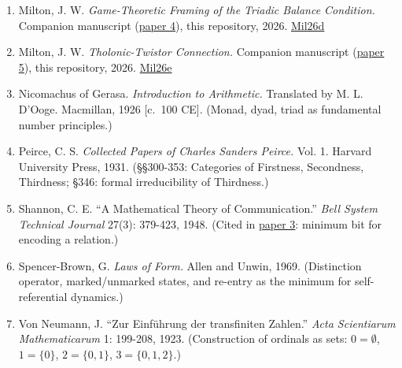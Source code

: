 \documentclass[12pt]{article}
\begin{document}
\begin{enumerate}
{  3}), this repository, 2026.
  \href{https://github.com/baardev/truevalue/blob/main/docnav/Research/papers/3_minimal-recursive-triadic-framework/3_minimal-recursive-triadic-framework.pdf}{Mil26b}
\item
  Milton, J. W. \emph{Game-Theoretic Framing of the Triadic Balance
  Condition.} Companion manuscript
  (\href{https://github.com/baardev/truevalue/blob/main/docnav/Research/papers/4_game-theoretic-triadic-balance/4_game-theoretic-triadic-balance.pdf}{paper
  4}), this repository, 2026.
  \href{https://github.com/baardev/truevalue/blob/main/docnav/Research/papers/4_game-theoretic-triadic-balance/4_game-theoretic-triadic-balance.pdf}{Mil26d}
\item
  Milton, J. W. \emph{Tholonic-Twistor Connection.} Companion manuscript
  (\href{https://github.com/baardev/truevalue/blob/main/docnav/Research/papers/5_tholonic-twistor-connection/5_tholonic-twistor-connection.pdf}{paper
  5}), this repository, 2026.
  \href{https://github.com/baardev/truevalue/blob/main/docnav/Research/papers/5_tholonic-twistor-connection/5_tholonic-twistor-connection.pdf}{Mil26e}
\item
  Nicomachus of Gerasa. \emph{Introduction to Arithmetic.} Translated by
  M. L. D'Ooge. Macmillan, 1926 {[}c.~100 CE{]}. (Monad, dyad, triad as
  fundamental number principles.)
\item
  Peirce, C. S. \emph{Collected Papers of Charles Sanders Peirce.} Vol.
  1. Harvard University Press, 1931. (§§300-353: Categories of
  Firstness, Secondness, Thirdness; §346: formal irreducibility of
  Thirdness.)
\item
  Shannon, C. E. ``A Mathematical Theory of Communication.'' \emph{Bell
  System Technical Journal} 27(3): 379-423, 1948. (Cited in
  \href{https://github.com/baardev/truevalue/blob/main/docnav/Research/papers/3_minimal-recursive-triadic-framework/3_minimal-recursive-triadic-framework.pdf}{paper
  3}: minimum bit for encoding a relation.)
\item
  Spencer-Brown, G. \emph{Laws of Form.} Allen and Unwin, 1969.
  (Distinction operator, marked/unmarked states, and re-entry as the
  minimum for self-referential dynamics.)
\item
  Von Neumann, J. ``Zur Einführung der transfiniten Zahlen.'' \emph{Acta
  Scientiarum Mathematicarum} 1: 199-208, 1923. (Construction of
  ordinals as sets: \(0 = \emptyset\), \(1 = \{0\}\), \(2 = \{0,1\}\),
  \(3 = \{0,1,2\}\).)
\end{enumerate}
\end{document}
